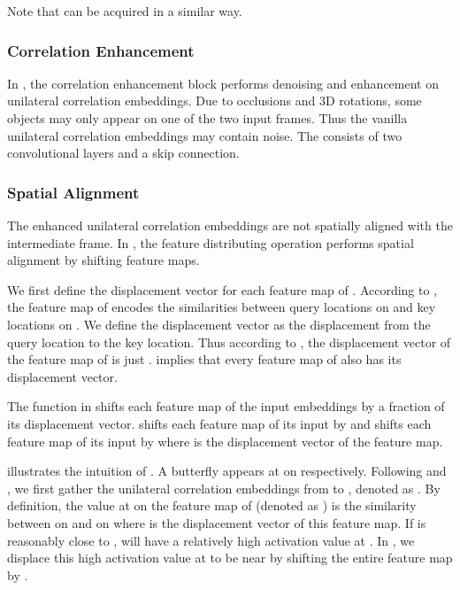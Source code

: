 \documentclass{article}
\begin{document}
Note that  can be acquired in a similar way.

\subsubsection{Correlation Enhancement}

In , the correlation enhancement block  performs denoising and enhancement on unilateral correlation embeddings. Due to occlusions and 3D rotations, some objects may only appear on one of the two input frames. Thus the vanilla unilateral correlation embeddings may contain noise. The  consists of two convolutional layers and a skip connection.

\subsubsection{Spatial Alignment}
The enhanced unilateral correlation embeddings are not spatially aligned with the intermediate frame. In , the feature distributing operation  performs spatial alignment by shifting feature maps.

We first define the displacement vector for each feature map of . According to , the  feature map of  encodes the similarities between query locations on  and key locations on . We define the displacement vector as the displacement from the query location to the key location. Thus according to , the displacement vector  of the  feature map of  is just .  implies that every feature map of  also has its displacement vector.

The  function in  shifts each feature map of the input embeddings by a fraction of its displacement vector.  shifts each feature map of its input by  and  shifts each feature map of its input by  where  is the displacement vector of the feature map.

 illustrates the intuition of . A butterfly appears at  on  respectively. Following  and , we first gather the unilateral correlation embeddings from  to , denoted as . By definition, the value at  on the  feature map of  (denoted as ) is the similarity between  on  and  on  where  is the displacement vector of this feature map. If  is reasonably close to ,  will have a relatively high activation value at . In , we displace this high activation value at  to be near  by shifting the entire feature map by . 
\end{document}

